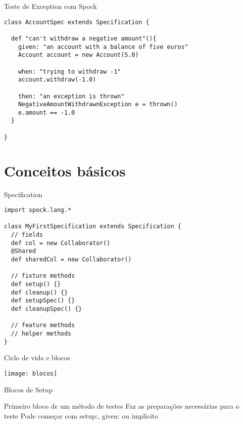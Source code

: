 \documentclass{beamer}
\begin{document}
\begin{frame}[fragile]{Teste de Exception com Spock}
 \begin{verbatim}
class AccountSpec extends Specification {
  
  def "can't withdraw a negative amount"(){
    given: "an account with a balance of five euros"
    Account account = new Account(5.0)
    
    when: "trying to withdraw -1"
    account.withdraw(-1.0)
    
    then: "an exception is thrown"
    NegativeAmountWithdrawnException e = thrown()
    e.amount == -1.0
  }
  
}
  \end{verbatim}
\end{frame}

\section{Conceitos básicos}

\begin{frame}[fragile]{Specification}
 \begin{verbatim}
import spock.lang.*

class MyFirstSpecification extends Specification {
  // fields
  def col = new Collaborator()
  @Shared
  def sharedCol = new Collaborator()
  
  // fixture methods
  def setup() {}
  def cleanup() {}
  def setupSpec() {}
  def cleanupSpec() {}

  // feature methods
  // helper methods
}
  \end{verbatim}
\end{frame}

\begin{frame}{Ciclo de vida e blocos}
  \begin{center}
    \texttt{[image: blocos]}
  \end{center}
\end{frame}

\begin{frame}{Blocos de Setup}
 \begin{outline}
    Primeiro bloco de um método de testes
    Faz as preparações necessárias para o teste
    Pode começar com \alert{setup:}, \alert{given:} ou implícito
 \end{outline}
\end{frame}
\end{document}
